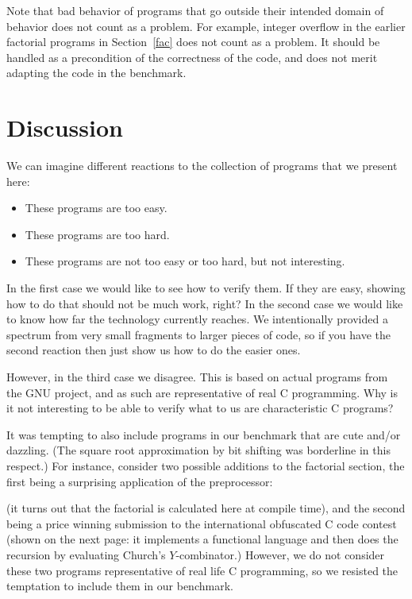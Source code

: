 \documentclass{article}
\begin{document}
Note that bad behavior of programs that go outside their
intended domain of behavior does not count as a problem.
For example, integer overflow in the earlier factorial programs in Section~\ref{fac}
does not count as a problem.
It should be handled as a precondition of the correctness of the code, and
does not merit adapting the code in the benchmark.

\section{Discussion}
We can imagine different reactions to the collection of programs that we present here:
\begin{itemize}
\item
These programs are too easy.

\item
These programs are too hard.

\item
These programs are not too easy or too hard, but not interesting.

\end{itemize}
\noindent
In the first case we would like to see how to verify them.
If they are easy, showing how to do that should not be much work, right?
In the second case we would like to know how far the technology
currently reaches.
We intentionally provided a spectrum from very small fragments
to larger pieces of code, so if you have the second reaction then just show us how to do the easier ones.

However, in the third case we disagree.
This is based on actual programs from the GNU project,
and as such are representative of real C programming.
Why is it not interesting to be able to verify what
to us are characteristic C programs?

It was tempting to also include programs in our benchmark that are cute and/or dazzling.
(The square root approximation by bit shifting was borderline in this respect.)
For instance, consider two possible additions to the factorial
section,
the first being a surprising application of the preprocessor:


(it turns out that the factorial is calculated here at compile time),
and the second being a price winning submission to the international
obfuscated C code contest
(shown on the next page: it implements a functional language and then does the recursion by
evaluating Church's $Y$-combinator.)
However, we do not consider these two programs representative of
real life C programming, so we resisted the temptation to include them in our benchmark.
\end{document}
